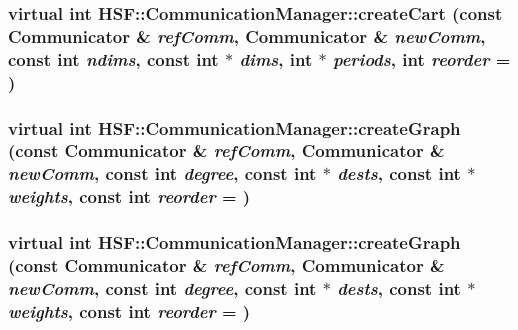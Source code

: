 \hypertarget{classHSF_1_1CommunicationManager_a1128786fe9a8887c1e02f00bcabcd0a6}{
\subsubsection[{createCart}]{\setlength{\rightskip}{0pt plus 5cm}virtual int HSF::CommunicationManager::createCart (const {\bf Communicator} \& {\em refComm}, \/  {\bf Communicator} \& {\em newComm}, \/  const int {\em ndims}, \/  const int $\ast$ {\em dims}, \/  int $\ast$ {\em periods}, \/  int {\em reorder} = {})}}
\label{classHSF_1_1CommunicationManager_a1128786fe9a8887c1e02f00bcabcd0a6}
\hypertarget{classHSF_1_1CommunicationManager_a6740c20953c04b2283a830b8f1226d9f}{
\subsubsection[{createGraph}]{\setlength{\rightskip}{0pt plus 5cm}virtual int HSF::CommunicationManager::createGraph (const {\bf Communicator} \& {\em refComm}, \/  {\bf Communicator} \& {\em newComm}, \/  const int {\em degree}, \/  const int $\ast$ {\em dests}, \/  const int $\ast$ {\em weights}, \/  const int {\em reorder} = {})}}
\label{classHSF_1_1CommunicationManager_a6740c20953c04b2283a830b8f1226d9f}
\hypertarget{classHSF_1_1CommunicationManager_a6740c20953c04b2283a830b8f1226d9f}{
\subsubsection[{createGraph}]{\setlength{\rightskip}{0pt plus 5cm}virtual int HSF::CommunicationManager::createGraph (const {\bf Communicator} \& {\em refComm}, \/  {\bf Communicator} \& {\em newComm}, \/  const int {\em degree}, \/  const int $\ast$ {\em dests}, \/  const int $\ast$ {\em weights}, \/  const int {\em reorder} = {})}}

